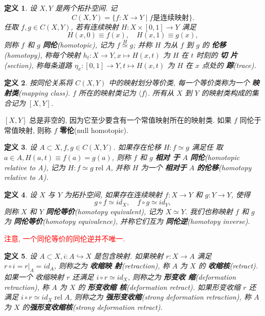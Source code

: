 \documentclass{ctexart}
\newtheorem*{defn}{定义}
\DeclareMathOperator{\rel}{rel}
\begin{document}
\begin{defn}
设 $X,Y$ 是两个拓扑空间. 记
\[
C(X,Y) = \{f : X \to Y \mid f \text{是连续映射}\}.
\]
任取 $f,g \in C(X,Y)$, 若有连续映射 $H : X \times [0,1] \to Y$ 满足
\[
H(x,0) \equiv f(x),\hspace{1em} H(x,1) \equiv g(x),
\]
则称 $f$ 和 $g$ \textbf{同伦}(homotopic), 记为 $f \overset{H}{\simeq}
g$; 并称 $H$ 为从 $f$ 到 $g$ 的 \textbf{伦移}(homotopy), 称每个映射
$h_t : X \to Y, x \mapsto H(x,t)$ 为 $H$ 在 $t$ 时刻的 \textbf{切
  片}(section), 称每条道路 $\eta_x : [0,1] \to Y, t \mapsto H(x,t)$ 为
$H$ 在 $x$ 点处的 \textbf{踪}(trace).
\end{defn}
\begin{defn}
按同伦关系将 $C(X,Y)$ 中的映射划分等价类, 每一个等价类称为一个
\textbf{映射类}(mapping class). $f$ 所在的映射类记为 $\langle f
\rangle$. 所有从 $X$ 到 $Y$ 的映射类构成的集合记为 $[X,Y]$.
\end{defn}

$[X,Y]$ 总是非空的, 因为它至少要含有一个常值映射所在的映射类. 如果 $f$
同伦于常值映射, 则称 $f$ \textbf{零伦}(null homotopic).

\begin{defn}
设 $A \subset X, f,g \in C(X,Y)$. 如果存在伦移 $H : f \simeq g$ 满足任
取 $a \in A, H(a,t) \equiv f(a) = g(a)$, 则称 $f$ 和 $g$ \textbf{相对
  于} $A$ \textbf{同伦}(homotopic relative to A), 记为 $H : f \simeq g
\rel A$, 并称 $H$ 为一个 \textbf{相对于} $A$ \textbf{的伦移}(homotopy
relative to A).
\end{defn}

\begin{defn}
设 $X$ 与 $Y$ 为拓扑空间, 如果存在连续映射 $f : X \to Y$ 和 $g : Y \to
Y$, 使得
\[
g \circ f \simeq id_X, \hspace{1em} f \circ g \simeq id_Y,
\]
则称 $X$ 和 $Y$ \textbf{同伦等价}(homotopy equivalent), 记为 $X \simeq
Y$. 我们也称映射 $f$ 和 $g$ 为 \textbf{同伦等价}(homotopy
equivalence), 并称它们互为 \textbf{同伦逆}(homotopy inverse).
\end{defn}
\textcolor{red}{注意, 一个同伦等价的同伦逆并不唯一.}

\begin{defn}
设 $A \subset X, i : A \hookrightarrow X$ 是包含映射. 如果映射 $r : X
\to A$ 满足 $r \circ i = r|_A = id_A$, 则称之为 \textbf{收缩映
  射}(retraction), 称 $A$ 为 $X$ 的 \textbf{收缩核}(retract). 如果一个
收缩映射 $r$ 还满足 $i \circ r \simeq id_X$, 则称之为 \textbf{形变收
  缩}(deformation retraction), 称 $A$ 为 $X$ 的 \textbf{形变收缩
  核}(deformation retract). 如果形变收缩 $r$ 还满足 $i \circ r \simeq
id_X \rel A$, 则称之为 \textbf{强形变收缩}(strong deformation
retraction), 称 $A$ 为 $X$ 的\textbf{强形变收缩核}(strong deformation retract).
\end{defn}
\end{document}
